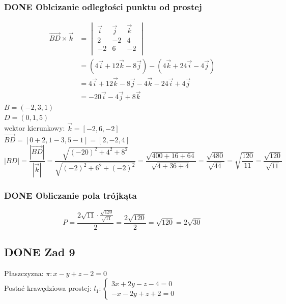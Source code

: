 \documentclass[11pt]{article}
\begin{document}
\subsubsection{{\bfseries\sffamily DONE} Oblcizanie odległości punktu od prostej}
\label{sec:org430b10f}
\begin{align*}
  \overrightarrow{BD} \times \vec{k}
  &= \begin{vmatrix}
       \vec{i} & \vec{j} & \vec{k}\\
       2 & -2 & 4\\
       -2 & 6 & -2\\
     \end{vmatrix}
  \\
  &= (4\vec{i} + 12\vec{k} - 8 \vec{j}) - (4 \vec{k} + 24 \vec{i} - 4 \vec{j})
  \\
  &= 4\vec{i} + 12\vec{k} - 8 \vec{j} - 4 \vec{k} - 24 \vec{i} + 4 \vec{j}
  \\
  &= -20\vec{i} - 4\vec{j} + 8 \vec{k}
\end{align*}
\(B=(-2,3,1)\)
\\\empty
\(D=(0, 1, 5)\)
\\\empty
wektor kierunkowy: \(\vec{k} = [-2, 6, -2]\)
\\\empty
\(\overrightarrow{BD} = [0 + 2 , 1 - 3 ,5 -1] = [2, -2, 4]\)
\\\empty
$$|BD| = \frac{|\overrightarrow{BD}|}{|\vec{k}|}
= \frac{\sqrt{(-20)^{2} + 4^{2} + 8^{2}}}
{\sqrt{(-2)^{2} + 6^{2} + (-2)^{2}} }
= \frac{\sqrt{400 + 16 + 64}}{\sqrt{4 + 36 + 4}}
= \frac{\sqrt{480}}{\sqrt{44}}
= \sqrt{\frac{120}{11}}
= \frac{\sqrt{120}}{\sqrt{11}}$$
\subsubsection{{\bfseries\sffamily DONE} Obliczanie pola trójkąta}
\label{sec:orgd9c2ff6}
$$P = \frac{ 2\sqrt{11} \cdot\frac{ \sqrt{120} }{\sqrt{11}} }
{2}
= \frac{2\sqrt{120}}{2}
= \sqrt{120}
= 2\sqrt{30}$$
\subsection{{\bfseries\sffamily DONE} Zad 9}
\label{sec:org0d54a69}
Płaszczyzna: \(\pi : x - y + z - 2 = 0\)
\\\empty
Postać krawędziowa prostej:
\(l_1 : \begin{cases}
3x + 2y - z - 4 = 0\\
-x - 2y + z + 2 = 0
\end{cases}\)
\end{document}
